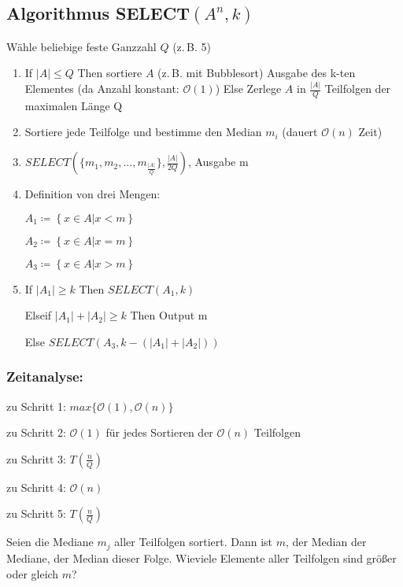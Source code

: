 \documentclass[ngerman,draft,parskip=half*,twoside]{scrreprt}
\theoremstyle{break}
\theoremstyle{nonumberbreak}
\newcommand*{\OO}{\mathcal{O}}      %
\begin{document}
 \subsection{Algorithmus \texorpdfstring{SELECT$(A^{n},k)$}{SELECT (An,k)}}
 Wähle beliebige feste Ganzzahl $Q$ (z.\,B. 5)
 \begin{enumerate}[Schr{i}tt~1:]
  \item If $|A|\leq Q$ Then sortiere $A$ (z.\,B. mit Bubblesort)
  \hspace{2cm}Ausgabe des k-ten Elementes \hfill(da Anzahl konstant: $\OO(1)$)
  \hspace{1cm}Else Zerlege $A$ in $\frac{\left|A\right|}{Q}$ Teilfolgen der maximalen Länge Q
  \item Sortiere jede Teilfolge und bestimme den Median $m_{i}$ \hfill(dauert $\OO(n)$ Zeit)
  \item $SELECT(\{m_{1}, m_{2}, \ldots , m_{\frac{\left|A\right|}{Q}}\},\frac{\left|A\right|}{2Q})$, Ausgabe m
  \item Definition von drei Mengen:

  $A_{1}\coloneqq \left\{x\in A|x<m\right\}$

  $A_{2}\coloneqq \left\{x\in A|x=m\right\}$

  $A_{3}\coloneqq \left\{x\in A|x>m\right\}$
  \item If $|A_{1}|\geq k$ Then $SELECT (A_{1},k)$

  \hspace{1cm}Elseif $\left|A_{1}\right|+\left|A_{2}\right|\geq k$ Then Output m

  \hspace{1cm}Else $SELECT (A_{3},k-(\left|A_{1}\right|+\left|A_{2}\right|))$
 \end{enumerate}
 
 \subsubsection{Zeitanalyse:}
 \hspace{4mm}zu Schritt 1: $max\{\OO(1),\OO(n)\}$

 zu Schritt 2: $\OO(1)$ für jedes Sortieren der $\OO(n)$ Teilfolgen

 zu Schritt 3: $T(\frac{n}{Q})$

 zu Schritt 4: $\OO(n)$

 zu Schritt 5: $T(\frac{n}{Q})$
 
 
Seien die Mediane $m_{j}$ aller Teilfolgen sortiert. Dann ist $m$, der Median der Mediane, der Median dieser Folge. 
Wieviele Elemente aller Teilfolgen sind größer oder gleich $m$?
\end{document}

